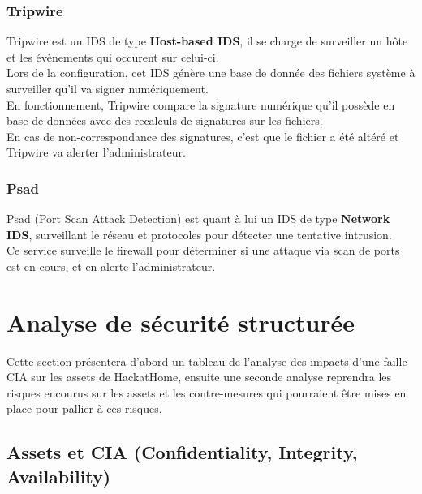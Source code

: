 \documentclass[a4paper,10pt,final,fleqn]{article}
\begin{document}
				\subsubsection{Tripwire}

					Tripwire est un IDS de type \textbf{Host-based IDS}, il se charge de surveiller un hôte et les évènements qui occurent sur celui-ci.\\

					Lors de la configuration, cet IDS génère une base de donnée des fichiers système à surveiller qu'il va signer numériquement.\\

					En fonctionnement, Tripwire compare la signature numérique qu'il possède en base de données avec des recalculs de signatures sur les fichiers.\\

					En cas de non-correspondance des signatures, c'est que le fichier a été altéré et Tripwire va alerter l'administrateur.\\

				\subsubsection{Psad}

					Psad (Port Scan Attack Detection) est quant à lui un IDS de type \textbf{Network IDS}, surveillant le réseau et protocoles pour détecter une tentative intrusion.\\

					Ce service surveille le firewall pour déterminer si une attaque via scan de ports est en cours, et en alerte l'administrateur.\\


		\section{Analyse de sécurité structurée}

			Cette section présentera d'abord un tableau de l'analyse des impacts d'une faille CIA sur les assets de HackatHome, ensuite une seconde analyse reprendra les risques encourus sur les assets et les contre-mesures qui pourraient être mises en place pour pallier à ces risques.\\

			\subsection{Assets et CIA (Confidentiality, Integrity, Availability)}
\end{document}
